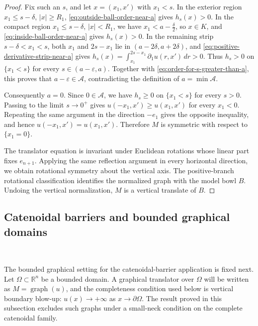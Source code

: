 \documentclass{amsart}
\theoremstyle{plain}
\theoremstyle{mainintrothm}
\theoremstyle{definition}
\begin{document}
\begin{proof}
	\medskip
	
	Fix such an $s$, and let $x=(x_1,x')$ with $x_1<s$.  In the exterior region
	$x_1\le s-\delta$, $|x|\ge R_1$, \eqref{eq:outside-ball-order-near-a} gives
	$h_s(x)>0$.  In the compact region $x_1\le s-\delta$, $|x|<R_1$, we have
	$x_1<a-\frac{\delta}{2}$, so $x\in K$, and
	\eqref{eq:inside-ball-order-near-a} gives $h_s(x)>0$.  In the remaining
	strip $s-\delta<x_1<s$, both $x_1$ and $2s-x_1$ lie in
	$(a-2\delta,a+2\delta)$, and \eqref{eq:positive-derivative-strip-near-a}
	gives
	$h_s(x)=\int_{x_1}^{2s-x_1}\partial_1u(r,x')\,dr>0$.
	Thus $h_s>0$ on $\{x_1<s\}$ for every $s\in(a-\varepsilon,a)$.  Together
	with \eqref{eq:order-for-s-greater-than-a}, this proves that
	$a-\varepsilon\in\mathcal A$, contradicting the definition of
	$a=\min\mathcal A$.
	
	\medskip
	
	Consequently $a=0$.  Since $0\in\mathcal A$, we have
	$h_s\ge0$ on $\{x_1<s\}$ for every $s>0$.  Passing to the limit
	$s\to0^+$ gives $u(-x_1,x')\ge u(x_1,x')$ for every $x_1<0$.  Repeating the
	same argument in the direction $-e_1$ gives the opposite inequality, and
	hence $u(-x_1,x')=u(x_1,x')$.  Therefore $M$ is symmetric with respect to
	$\{x_1=0\}$.
	
	\medskip
	
	The translator equation is invariant under Euclidean rotations whose linear
	part fixes $e_{n+1}$.  Applying the same reflection argument in every
	horizontal direction, we obtain rotational symmetry about the vertical axis.
	The positive-branch rotational classification identifies the normalized graph
	with the model bowl $B$.  Undoing the vertical normalization, $M$ is a
	vertical translate of $B$.
	
\end{proof}

	
	
	\subsection{Catenoidal barriers and bounded graphical domains}\,
	\label{subsec:catenoidal-barriers-bounded-domains}
	
	The bounded graphical setting for the catenoidal-barrier application is fixed
	next.  Let $\Omega\subset\mathbb R^n$ be a bounded domain.  A graphical
	translator over $\Omega$ will be written as $M=\operatorname{graph}(u)$, and the
	completeness condition used below is vertical boundary blow-up:
   $u(x)\to+\infty$ as $x\to\partial\Omega $. The result proved in this subsection excludes such graphs under a small-neck condition on the complete catenoidal family.
	
\end{document}
